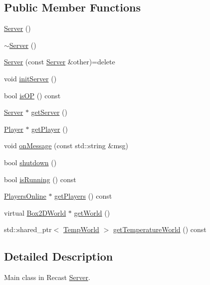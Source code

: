\subsection*{Public Member Functions}
\begin{DoxyCompactItemize}
\item 
\hyperlink{class_server_ad5ec9462b520e59f7ea831e157ee5e59}{Server} ()
\item 
\hyperlink{class_server_a4b3aa2579cb1c8cd1d069582c14d0fa6}{$\sim$\-Server} ()
\item 
\hyperlink{class_server_aca4a9834f8bf136619d3c4cdb1db4e1e}{Server} (const \hyperlink{class_server}{Server} \&other)=delete
\item 
void \hyperlink{class_server_a7bc5c00fa3ae1ddfae71274ee7d025ea}{init\-Server} ()
\item 
bool \hyperlink{class_server_a7b6439f1e85af364215c544d675ea972}{is\-O\-P} () const 
\item 
\hyperlink{class_server}{Server} $\ast$ \hyperlink{class_server_a8af940772beedcc0b1243adf3f5aec0c}{get\-Server} ()
\item 
\hyperlink{struct_player}{Player} $\ast$ \hyperlink{class_server_a35be365123751e27d6c52ad3962b9b1e}{get\-Player} ()
\item 
void \hyperlink{class_server_a37a56fedea3137e9b8080ee0e86e8278}{on\-Message} (const std\-::string \&msg)
\item 
bool \hyperlink{class_server_a58c74bafaaf20b24e9243c7cf5fdfd16}{shutdown} ()
\item 
bool \hyperlink{class_server_ab8c22a0d6809e9aa84bebce478ba7bc5}{is\-Running} () const 
\item 
\hyperlink{class_players_online}{Players\-Online} $\ast$ \hyperlink{class_server_ab103cde2777536fa63b2746b6e0a98d4}{get\-Players} () const 
\item 
virtual \hyperlink{class_box2_d_world}{Box2\-D\-World} $\ast$ \hyperlink{class_server_ad5e54ba60c174321e880e1a10e61cc53}{get\-World} ()
\item 
std\-::shared\-\_\-ptr$<$ \hyperlink{_server_8hpp_ac147588bd69e1d052194e0dea10202ff}{Temp\-World} $>$ \hyperlink{class_server_adc049030ac9523415295a889a2e34042}{get\-Temperature\-World} () const 
\end{DoxyCompactItemize}


\subsection{Detailed Description}
Main class in Recast \hyperlink{class_server}{Server}. 


